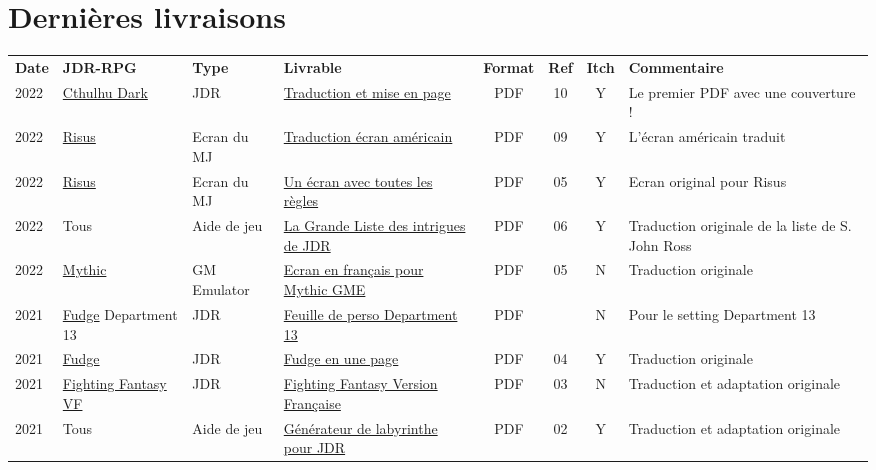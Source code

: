 \documentclass[a4paper, 11pt, twoside]{article}
\begin{document}
\section{Dernières livraisons}
\label{sec:org538a122}
\begin{longtable}{p{0.6cm}p{2cm}p{1.5cm}p{4cm}cccp{3.8cm}}
\textbf{Date} & \textbf{JDR-RPG} & \textbf{Type} & \textbf{Livrable} & \textbf{Format} & \textbf{Ref} & \textbf{Itch} & \textbf{Commentaire}\\
2022 & \href{https://github.com/orey/cthulhu-dark-fr}{Cthulhu Dark} & JDR & \href{https://rouboudou.itch.io}{Traduction et mise en page} & PDF & 10 & Y & Le premier PDF avec une couverture !\\
2022 & \href{https://github.com/orey/jdr-risus}{Risus} & Ecran du MJ & \href{https://rouboudou.itch.io/risus}{Traduction écran américain} & PDF & 09 & Y & L'écran américain traduit\\
2022 & \href{https://github.com/orey/jdr-risus}{Risus} & Ecran du MJ & \href{https://rouboudou.itch.io/risus}{Un écran avec toutes les règles} & PDF & 05 & Y & Ecran original pour Risus\\
2022 & Tous & Aide de jeu & \href{https://rouboudou.itch.io/la-grande-liste-des-intrigues-de-jdr}{La Grande Liste des intrigues de JDR} & PDF & 06 & Y & Traduction originale de la liste de S. John Ross\\
2022 & \href{https://github.com/orey/jdr/tree/master/Mythic-fr}{Mythic} & GM Emulator & \href{https://github.com/orey/jdr/blob/master/Mythic-fr/MythicGME-EcranMJ-VersionFrancaise-OreyJdr05.pdf}{Ecran en français pour Mythic GME} & PDF & 05 & N & Traduction originale\\
2021 & \href{https://github.com/orey/jdr/tree/master/Fudge-fr}{Fudge} Department 13 & JDR & \href{https://github.com/orey/jdr/blob/master/Fudge-fr/Division13/Department13-FeuillePerso.pdf}{Feuille de perso Department 13} & PDF &  & N & Pour le setting Department 13\\
2021 & \href{https://github.com/orey/jdr-fudge}{Fudge} & JDR & \href{https://rouboudou.itch.io/fudge}{Fudge en une page} & PDF & 04 & Y & Traduction originale\\
2021 & \href{https://github.com/orey/jdr/tree/master/FightingFantasys-fr}{Fighting Fantasy VF} & JDR & \href{https://github.com/orey/jdr/blob/master/FightingFantasys-fr/FightingFantasy-VersionFrancaise-OreyJdr03.pdf}{Fighting Fantasy Version Française} & PDF & 03 & N & Traduction et adaptation originale\\
2021 & Tous & Aide de jeu & \href{https://rouboudou.itch.io/dungeonsquad-fr}{Générateur de labyrinthe pour JDR} & PDF & 02 & Y & Traduction et adaptation originale\\

\end{longtable}
\end{document}
